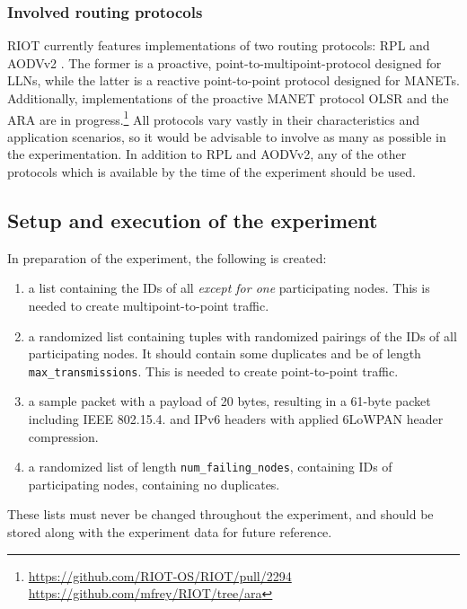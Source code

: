 \documentclass{acm_proc_article-sp}
\begin{document}
\subsubsection{Involved routing protocols}
\label{subsec:protocols}
RIOT currently features implementations of two routing protocols: RPL \cite{RFC-6550} and AODVv2 \cite{draft-ietf-manet-aodvv2-09}. The former is a proactive, point-to-multipoint-protocol designed for \glspl{LLN}, while the latter is a reactive point-to-point protocol designed for \glspl{MANET}. Additionally, implementations of the proactive \gls{MANET} protocol OLSR\cite{RFC-3626} and the \gls{ARA}\cite{ara} are in progress.\footnote{ \url{https://github.com/RIOT-OS/RIOT/pull/2294}\\  \url{https://github.com/mfrey/RIOT/tree/ara}}
All protocols vary vastly in their characteristics and application scenarios, so it would be advisable to involve as many as possible in the experimentation. In addition to RPL and AODVv2, any of the other protocols which is available by the time of the experiment should be used.

\subsection{Setup and execution of the experiment}
\label{subsec:setup}

In preparation of the experiment, the following is created:
\begin{enumerate}
\item a list containing the IDs of all \emph{except for one} participating nodes. This is needed to create multipoint-to-point traffic.
\item a randomized list containing tuples with randomized pairings of the IDs of all participating nodes. It should contain some duplicates and be of length \texttt{max\_transmissions}. This is needed to create point-to-point traffic.
\item a sample packet with a payload of 20 bytes, resulting in a 61-byte packet including IEEE 802.15.4. and IPv6 headers with applied 6LoWPAN header compression.
\item a randomized list of length \texttt{num\_failing\_nodes}, containing IDs of participating nodes, containing no duplicates.
\end{enumerate}
These lists must never be changed throughout the experiment, and should be stored along with the experiment data for future reference.\\
\end{document}
